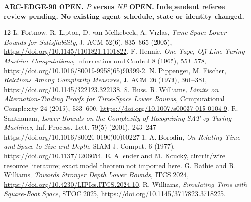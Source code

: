 \documentclass[11pt]{article}
\begin{document}
\noindent\textbf{ARC-EDGE-90 OPEN. $P$ versus $NP$ OPEN. Independent referee review pending. No existing agent schedule, state or identity changed.}
\begin{thebibliography}{12}
 L. Fortnow, R. Lipton, D. van Melkebeek, A. Viglas, \emph{Time-Space Lower Bounds for Satisfiability}, J. ACM 52(6), 835--865 (2005), \url{https://doi.org/10.1145/1101821.1101822}.
 F. Hennie, \emph{One-Tape, Off-Line Turing Machine Computations}, Information and Control 8 (1965), 553--578, \url{https://doi.org/10.1016/S0019-9958(65)90399-2}.
 N. Pippenger, M. Fischer, \emph{Relations Among Complexity Measures}, J. ACM 26 (1979), 361--381, \url{https://doi.org/10.1145/322123.322138}.
 S. Buss, R. Williams, \emph{Limits on Alternation-Trading Proofs for Time-Space Lower Bounds}, Computational Complexity 24 (2015), 533--600, \url{https://doi.org/10.1007/s00037-015-0104-9}.
 R. Santhanam, \emph{Lower Bounds on the Complexity of Recognizing SAT by Turing Machines}, Inf. Process. Lett. 79(5) (2001), 243--247, \url{https://doi.org/10.1016/S0020-0190(00)00227-1}.
 A. Borodin, \emph{On Relating Time and Space to Size and Depth}, SIAM J. Comput. 6 (1977), \url{https://doi.org/10.1137/0206054}.
 E. Allender and M. Kouck\'y, circuit/wire resource literature; exact model theorem not imported here.
 G. Bathie and R. Williams, \emph{Towards Stronger Depth Lower Bounds}, ITCS 2024, \url{https://doi.org/10.4230/LIPIcs.ITCS.2024.10}.
 R. Williams, \emph{Simulating Time with Square-Root Space}, STOC 2025, \url{https://doi.org/10.1145/3717823.3718225}.
\end{thebibliography}
\end{document}
